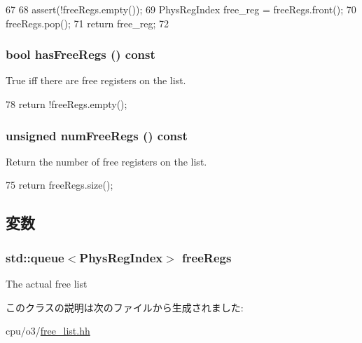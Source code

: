 \begin{DoxyCode}
67     {
68         assert(!freeRegs.empty());
69         PhysRegIndex free_reg = freeRegs.front();
70         freeRegs.pop();
71         return free_reg;
72     }
\end{DoxyCode}
\hypertarget{classSimpleFreeList_a8986100bc14f85e11279f599a34d0e78}{
\subsubsection[{hasFreeRegs}]{\setlength{\rightskip}{0pt plus 5cm}bool hasFreeRegs () const}}
\label{classSimpleFreeList_a8986100bc14f85e11279f599a34d0e78}
True iff there are free registers on the list. 


\begin{DoxyCode}
78 { return !freeRegs.empty(); }
\end{DoxyCode}
\hypertarget{classSimpleFreeList_a95b70656efc827474c66168faefd0c4f}{
\subsubsection[{numFreeRegs}]{\setlength{\rightskip}{0pt plus 5cm}unsigned numFreeRegs () const}}
\label{classSimpleFreeList_a95b70656efc827474c66168faefd0c4f}
Return the number of free registers on the list. 


\begin{DoxyCode}
75 { return freeRegs.size(); }
\end{DoxyCode}


\subsection{変数}
\hypertarget{classSimpleFreeList_a0aa9568834013c42d01789a6cfea8305}{
\subsubsection[{freeRegs}]{\setlength{\rightskip}{0pt plus 5cm}std::queue$<${\bf PhysRegIndex}$>$ {\bf freeRegs}}}
\label{classSimpleFreeList_a0aa9568834013c42d01789a6cfea8305}
The actual free list 

このクラスの説明は次のファイルから生成されました:\begin{DoxyCompactItemize}
\item 
cpu/o3/\hyperlink{free__list_8hh}{free\_\-list.hh}\end{DoxyCompactItemize}
